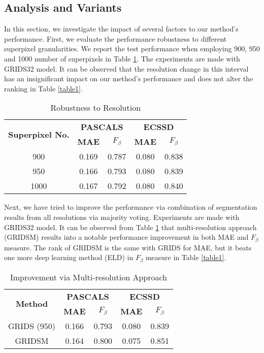 \documentclass[a4paper,conference]{IEEEtran}
\begin{document}
\subsection{Analysis and Variants}
In this section, we investigate the impact of several factors to our method's performance.
First, we evaluate the performance robustness to different superpixel granularities.
We report the test performance when employing 900, 950 and 1000 number of superpixels in Table \ref{table3}.
The experiments are made with GRIDS32 model.
It can be observed that the resolution change in this interval has an insignificant impact on our method's performance and does not alter the ranking in Table \ref{table1}.

\begin{table}[!t]
\renewcommand{\arraystretch}{1.3}
\caption{Robustness to Resolution}
\label{table3}
\centering
\begin{tabular}{|c||c||c||c||c|}
\hline
    \multirow{2}{2cm}{\textbf{Superpixel No.}} & \multicolumn{2}{c|}{\textbf{PASCALS}} & \multicolumn{2}{c|}{\textbf{ECSSD}}   \\
    \cline{2-5}
     &\textbf{MAE} & \textbf{$F_\beta$} & \textbf{MAE} & \textbf{$F_\beta$}   \\
    \hline

    900 & 0.169 & 0.787 & 0.080 & 0.838   \\ \hline
    950 & 0.166 & 0.793 & 0.080 & 0.839 \\ \hline
    1000 & 0.167 & 0.792 & 0.080 & 0.840  \\ \hline

\end{tabular}
\end{table}

Next, we have tried to improve the performance via combination of segmentation results from all resolutions via majority voting.
Experiments are made with GRIDS32 model.
It can be observed from Table \ref{table3} that multi-resolution approach (GRIDSM) results into a notable performance improvement in both MAE and $F_\beta$ measure.
The rank of GRIDSM is the same with GRIDS for MAE, but it beats one more deep learning method (ELD) in $F_\beta$ measure in Table \ref{table1}.


\begin{table}[!t]
\renewcommand{\arraystretch}{1.3}
\caption{Improvement via Multi-resolution Approach}
\label{table4}
\centering
\begin{tabular}{|c||c||c||c||c|}
\hline
    \multirow{2}{2cm}{\textbf{Method}} & \multicolumn{2}{c|}{\textbf{PASCALS}} & \multicolumn{2}{c|}{\textbf{ECSSD}}   \\
    \cline{2-5}
     &\textbf{MAE} & \textbf{$F_\beta$} & \textbf{MAE} & \textbf{$F_\beta$}   \\
    \hline

    GRIDS (950) & 0.166 & 0.793 & 0.080 & 0.839    \\ \hline
    GRIDSM & 0.164 & 0.800 & 0.075 & 0.851 \\ \hline

\end{tabular}
\end{table}
\end{document}
